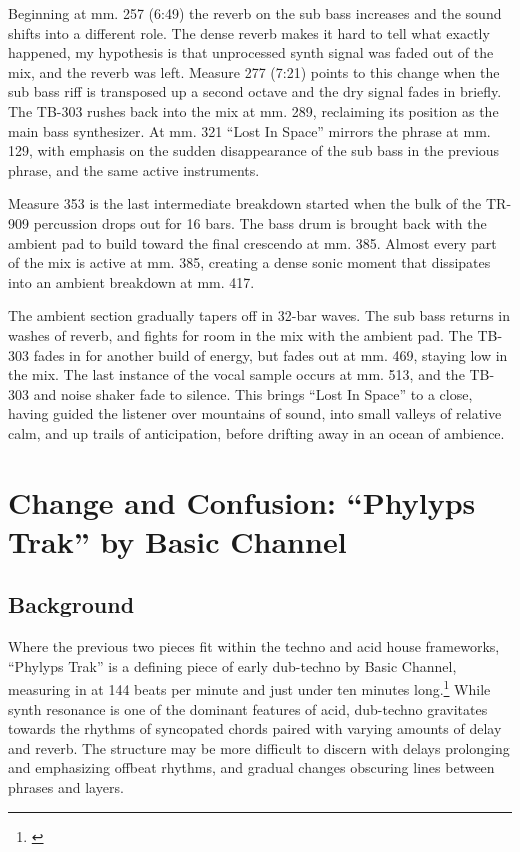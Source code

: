 \documentclass[12pt,twoside]{reedthesis}
\begin{document}
Beginning at mm. 257 (6:49) the reverb on the sub bass increases and the sound shifts into a different role. The dense reverb makes it hard to tell what exactly happened, my hypothesis is that unprocessed synth signal was faded out of the mix, and the reverb was left. Measure 277 (7:21) points to this change when the sub bass riff is transposed up a second octave and the dry signal fades in briefly. The TB-303 rushes back into the mix at mm. 289, reclaiming its position as the main bass synthesizer. At mm. 321 ``Lost In Space'' mirrors the phrase at mm. 129, with emphasis on the sudden disappearance of the sub bass in the previous phrase, and the same active instruments.

Measure 353 is the last intermediate breakdown started when the bulk of the TR-909 percussion drops out for 16 bars. The bass drum is brought back with the ambient pad to build toward the final crescendo at mm. 385. Almost every part of the mix is active at mm. 385, creating a dense sonic moment that dissipates into an ambient breakdown at mm. 417.

The ambient section gradually tapers off in 32-bar waves. The sub bass returns in washes of reverb, and fights for room in the mix with the ambient pad. The TB-303 fades in for another build of energy, but fades out at mm. 469, staying low in the mix. The last instance of the vocal sample occurs at mm. 513, and the TB-303 and noise shaker fade to silence. This brings ``Lost In Space'' to a close, having guided the listener over mountains of sound, into small valleys of relative calm, and up trails of anticipation, before drifting away in an ocean of ambience.


\newpage
\section{Change and Confusion: ``Phylyps Trak'' by Basic Channel}
\label{sec:phylyps}

\subsection{Background}

Where the previous two pieces fit within the techno and acid house frameworks, ``Phylyps Trak'' is a defining piece of early dub-techno by Basic Channel, measuring in at 144 beats per minute and just under ten minutes long.\footnote{\cite{basicchannelPhylypsTrak1993}}  While synth resonance is one of the dominant features of acid, dub-techno gravitates towards the rhythms of syncopated chords paired with varying amounts of delay and reverb. The structure may be more difficult to discern with delays prolonging and emphasizing offbeat rhythms, and gradual changes obscuring lines between phrases and layers.
\end{document}
